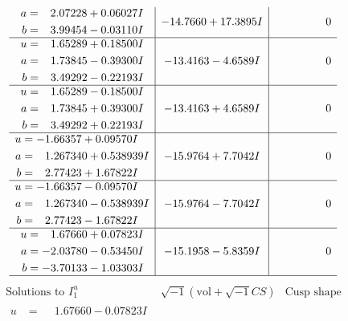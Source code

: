 \documentclass[1p]{elsarticle_modified}
\theoremstyle{definition}
\newcommand{\I}{\sqrt{-1}}
\begin{document}
$$\begin{array}{c|c|c}
\begin{aligned}
a &= \phantom{-}2.07228 + 0.06027 I \\
b &= \phantom{-}3.99454 - 0.03110 I\end{aligned}
 & -14.7660 + 17.3895 I & \phantom{-0.000000 } 0 \\ \hline\begin{aligned}
u &= \phantom{-}1.65289 + 0.18500 I \\
a &= \phantom{-}1.73845 - 0.39300 I \\
b &= \phantom{-}3.49292 - 0.22193 I\end{aligned}
 & -13.4163 - 4.6589 I & \phantom{-0.000000 } 0 \\ \hline\begin{aligned}
u &= \phantom{-}1.65289 - 0.18500 I \\
a &= \phantom{-}1.73845 + 0.39300 I \\
b &= \phantom{-}3.49292 + 0.22193 I\end{aligned}
 & -13.4163 + 4.6589 I & \phantom{-0.000000 } 0 \\ \hline\begin{aligned}
u &= -1.66357 + 0.09570 I \\
a &= \phantom{-}1.267340 + 0.538939 I \\
b &= \phantom{-}2.77423 + 1.67822 I\end{aligned}
 & -15.9764 + 7.7042 I & \phantom{-0.000000 } 0 \\ \hline\begin{aligned}
u &= -1.66357 - 0.09570 I \\
a &= \phantom{-}1.267340 - 0.538939 I \\
b &= \phantom{-}2.77423 - 1.67822 I\end{aligned}
 & -15.9764 - 7.7042 I & \phantom{-0.000000 } 0 \\ \hline\begin{aligned}
u &= \phantom{-}1.67660 + 0.07823 I \\
a &= -2.03780 - 0.53450 I \\
b &= -3.70133 - 1.03303 I\end{aligned}
 & -15.1958 - 5.8359 I & \phantom{-0.000000 } 0\\
 \hline 
 \end{array}$$\newpage$$\begin{array}{c|c|c}  
\text{Solutions to }I^u_{1}& \I (\text{vol} + \sqrt{-1}CS) & \text{Cusp shape}\\
 \hline 
\begin{aligned}
u &= \phantom{-}1.67660 - 0.07823 I \\

\end{aligned}
\end{array}$$
\end{document}
